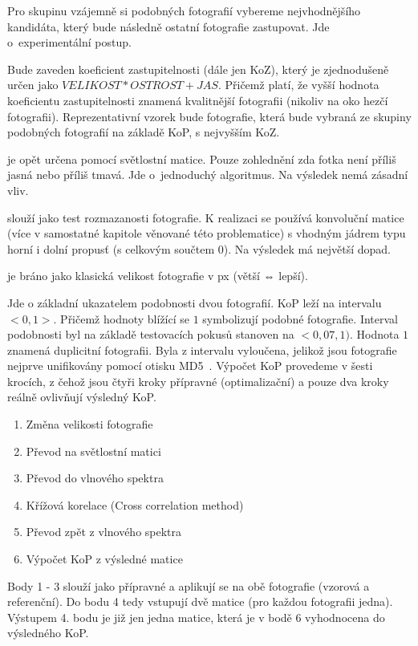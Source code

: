 Pro skupinu vzájemně si podobných fotografií vybereme nejvhodnějšího kandidáta, který bude následně ostatní fotografie zastupovat. Jde o~experimentální postup.

Bude zaveden koeficient zastupitelnosti (dále jen KoZ), který je zjednodušeně určen jako $ VELIKOST * OSTROST + JAS $. Přičemž platí, že vyšší hodnota koeficientu zastupitelnosti znamená kvalitnější fotografii (nikoliv na oko hezčí fotografii). Reprezentativní vzorek bude fotografie, která bude vybraná ze skupiny podobných fotografií na základě KoP, s nejvyšším KoZ.


je opět určena pomocí světlostní matice. Pouze zohlednění zda fotka není příliš jasná nebo příliš tmavá. Jde o~jednoduchý algoritmus. Na výsledek nemá zásadní vliv.

slouží jako test rozmazanosti fotografie. K realizaci se používá konvoluční matice (více v samostatné kapitole věnované této problematice) s vhodným jádrem typu horní i dolní propusť (s celkovým součtem 0). Na výsledek má největší dopad.

je bráno jako klasická velikost fotografie v px (větší ⇔ lepší).

Jde o základní ukazatelem podobnosti dvou fotografií. KoP leží na intervalu $ <0,1> $. Přičemž hodnoty blížící se $ 1 $ symbolizují podobné fotografie. Interval podobnosti byl na základě testovacích pokusů stanoven na $ <0,07, 1) $. Hodnota $ 1 $ znamená duplicitní fotografii. Byla z intervalu vyloučena, jelikož jsou fotografie nejprve unifikovány pomocí otisku MD5~\cite{md5}.
Výpočet KoP provedeme v šesti krocích, z čehož jsou čtyři kroky přípravné (optimalizační) a pouze dva kroky reálně ovlivňují výsledný KoP.
\begin{enumerate}
	\setlength{\parskip}{0pt}
	\setlength{\itemsep}{0pt}
	\item {Změna velikosti fotografie}
	\item {Převod na světlostní matici}
	\item {Převod do vlnového spektra}
	\item {Křížová korelace (Cross correlation method)}
	\item {Převod zpět z vlnového spektra}
	\item {Výpočet KoP z výsledné matice}
\end{enumerate}
Body 1 - 3 slouží jako přípravné a aplikují se na obě fotografie (vzorová a referenční). Do bodu 4 tedy vstupují dvě matice (pro každou fotografii jedna). Výstupem 4. bodu je již jen jedna matice, která je v bodě 6 vyhodnocena do výsledného KoP.

